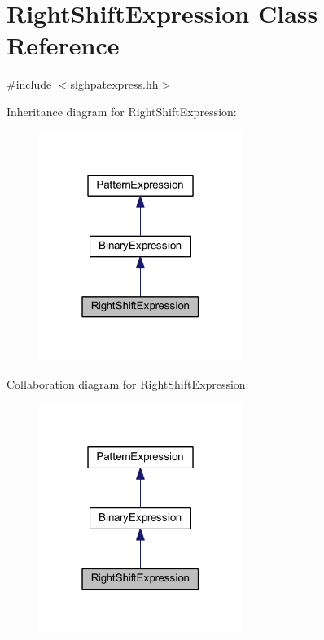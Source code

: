 \hypertarget{class_right_shift_expression}{}\section{Right\+Shift\+Expression Class Reference}
\label{class_right_shift_expression}


{\ttfamily \#include $<$slghpatexpress.\+hh$>$}



Inheritance diagram for Right\+Shift\+Expression\+:
\nopagebreak
\begin{figure}[H]
\begin{center}
\leavevmode
\includegraphics[width=187pt]{class_right_shift_expression__inherit__graph}
\end{center}
\end{figure}


Collaboration diagram for Right\+Shift\+Expression\+:
\nopagebreak
\begin{figure}[H]
\begin{center}
\leavevmode
\includegraphics[width=187pt]{class_right_shift_expression__coll__graph}
\end{center}
\end{figure}
